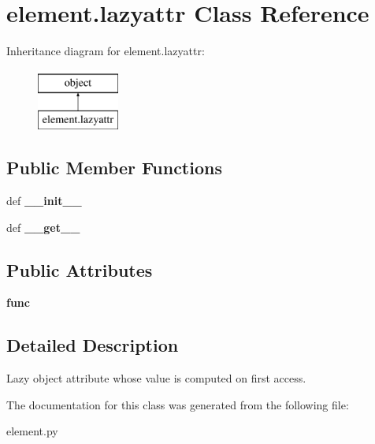 \hypertarget{classelement_1_1lazyattr}{\section{element.\+lazyattr Class Reference}
\label{classelement_1_1lazyattr}
}
Inheritance diagram for element.\+lazyattr\+:\begin{figure}[H]
\begin{center}
\leavevmode
\includegraphics[height=2.000000cm]{classelement_1_1lazyattr}
\end{center}
\end{figure}
\subsection*{Public Member Functions}
\begin{DoxyCompactItemize}
\item 
\hypertarget{classelement_1_1lazyattr_abe019bda74dcf6f487eb1cc2da614586}{def {\bfseries \+\_\+\+\_\+init\+\_\+\+\_\+}}\label{classelement_1_1lazyattr_abe019bda74dcf6f487eb1cc2da614586}

\item 
\hypertarget{classelement_1_1lazyattr_a550ef7410b7407ce6b410787efd2e2de}{def {\bfseries \+\_\+\+\_\+get\+\_\+\+\_\+}}\label{classelement_1_1lazyattr_a550ef7410b7407ce6b410787efd2e2de}

\end{DoxyCompactItemize}
\subsection*{Public Attributes}
\begin{DoxyCompactItemize}
\item 
\hypertarget{classelement_1_1lazyattr_abc53ebd33f56c2eb6c2de6f2400aeda2}{{\bfseries func}}\label{classelement_1_1lazyattr_abc53ebd33f56c2eb6c2de6f2400aeda2}

\end{DoxyCompactItemize}


\subsection{Detailed Description}
\begin{DoxyVerb}Lazy object attribute whose value is computed on first access.\end{DoxyVerb}
 

The documentation for this class was generated from the following file\+:\begin{DoxyCompactItemize}
\item 
element.\+py\end{DoxyCompactItemize}
